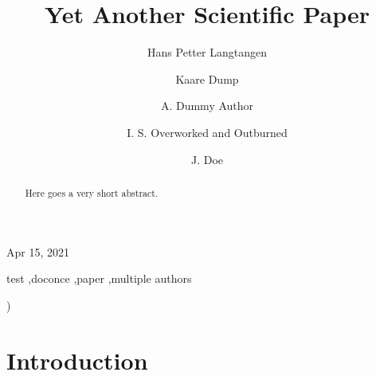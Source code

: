 \documentclass[final]{elsarticle}
\begin{document}

\newcommand{\exercisesection}[1]{\subsection*{#1}}








\begin{frontmatter}

\title{Yet Another Scientific Paper}


\author[inst1,inst2]{Hans Petter Langtangen}
\author[inst3]{Kaare Dump}
\author[]{A. Dummy Author}
\author[inst4,inst5,inst6,inst7]{I. S. Overworked and Outburned}
\author[]{J. Doe}\address[inst1]{Center for Biomedical Computing, Simula Research Laboratory}
\address[inst2]{Department of Informatics, University of Oslo}
\address[inst3]{Segfault, Cyberspace}
\address[inst4]{Inst1}
\address[inst5]{Inst2, Somewhere}
\address[inst6]{Third Inst, Elsewhere}
\address[inst7]{Fourth Inst}


\begin{center}
Apr 15, 2021
\end{center}

\vspace{1cm}

\begin{abstract}
Here goes
a very short
abstract.
\end{abstract}


\begin{keyword}
test \sep doconce \sep paper \sep multiple authors
\end{keyword}

\end{frontmatter}

)


\vspace{1cm} %

\section{Introduction}
\end{document}
